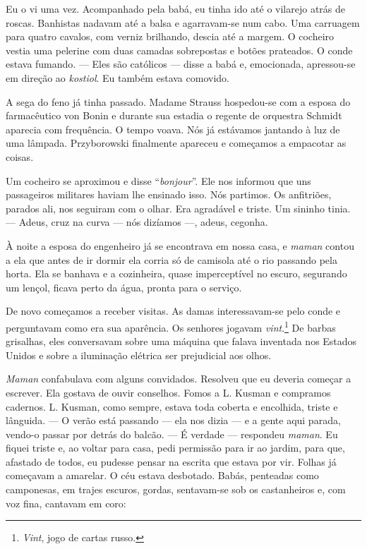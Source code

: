 Eu o vi uma vez. Acompanhado pela babá, eu tinha ido até o vilarejo
atrás de roscas. Banhistas nadavam até a balsa e agarravam-se num cabo.
Uma carruagem para quatro cavalos, com verniz brilhando, descia até a
margem. O cocheiro vestia uma pelerine com duas camadas sobrepostas e
botões prateados. O conde estava fumando. --- Eles são católicos ---
disse a babá e, emocionada, apressou-se em direção ao \emph{kostiol}. Eu
também estava comovido.

A sega do feno já tinha passado. Madame Strauss hospedou-se com a esposa
do farmacêutico von Bonin e durante sua estadia o regente de orquestra
Schmidt aparecia com frequência. O tempo voava. Nós já estávamos
jantando à luz de uma lâmpada. Przyborowski finalmente apareceu e
começamos a empacotar as coisas.

Um cocheiro se aproximou e disse ``\emph{bonjour}''. Ele nos informou
que uns passageiros militares haviam lhe ensinado isso. Nós partimos. Os
anfitriões, parados ali, nos seguiram com o olhar. Era agradável e
triste. Um sininho tinia. --- Adeus, cruz na curva --- nós dizíamos ---,
adeus, cegonha.

À noite a esposa do engenheiro já se encontrava em nossa casa, e
\emph{maman} contou a ela que antes de ir dormir ela corria só de
camisola até o rio passando pela horta. Ela se banhava e a cozinheira,
quase imperceptível no escuro, segurando um lençol, ficava perto da
água, pronta para o serviço.

De novo começamos a receber visitas. As damas interessavam-se pelo conde
e perguntavam como era sua aparência. Os senhores jogavam
\emph{vint}.\footnote{\emph{Vint}, jogo de cartas russo.} De barbas
grisalhas, eles conversavam sobre uma máquina que falava inventada nos
Estados Unidos e sobre a iluminação elétrica ser prejudicial aos olhos.

\emph{Maman} confabulava com alguns convidados. Resolveu que eu deveria
começar a escrever. Ela gostava de ouvir conselhos. Fomos a L. Kusman e
compramos cadernos. L. Kusman, como sempre, estava toda coberta e
encolhida, triste e lânguida. --- O verão está passando --- ela nos
dizia --- e a gente aqui parada, vendo-o passar por detrás do balcão.
--- É verdade --- respondeu \emph{maman}. Eu fiquei triste e, ao voltar
para casa, pedi permissão para ir ao jardim, para que, afastado de
todos, eu pudesse pensar na escrita que estava por vir. Folhas já
começavam a amarelar. O céu estava desbotado. Babás, penteadas como
camponesas, em trajes escuros, gordas, sentavam-se sob os castanheiros
e, com voz fina, cantavam em coro:

